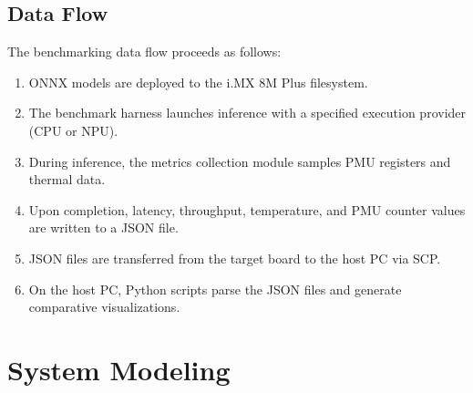 \subsection{Data Flow}
The benchmarking data flow proceeds as follows:
\begin{enumerate}
    \item ONNX models are deployed to the i.MX 8M Plus filesystem.
    \item The benchmark harness launches inference with a specified execution provider (CPU or NPU).
    \item During inference, the metrics collection module samples PMU registers and thermal data.
    \item Upon completion, latency, throughput, temperature, and PMU counter values are written to a JSON file.
    \item JSON files are transferred from the target board to the host PC via SCP.
    \item On the host PC, Python scripts parse the JSON files and generate comparative visualizations.
\end{enumerate}

\section{System Modeling}



